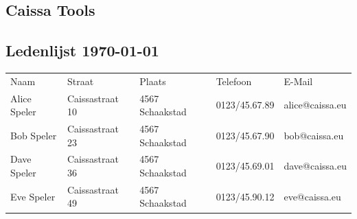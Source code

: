 \documentclass[a4paper]{scrreprt}
\begin{document}
 \begin{landscape}
  \section*{\color{headingkleur}Caissa Tools}
  \subsection*{\color{headingkleur}Ledenlijst \today{}}
  \begin{center}
   \begin{tabular}{ l l l l l }
    \rowcolor{headingkleur}
    \color{headingtekstkleur}Naam & \color{headingtekstkleur}Straat & \color{headingtekstkleur}Plaats & \color{headingtekstkleur}Telefoon & \color{headingtekstkleur}E-Mail \\
   Alice Speler & Caissastraat 10 & 4567 Schaakstad & 0123/45.67.89 & alice@caissa.eu \\
   Bob Speler & Caissastraat 23 & 4567 Schaakstad & 0123/45.67.90 & bob@caissa.eu \\
   Dave Speler & Caissastraat 36 & 4567 Schaakstad & 0123/45.69.01 & dave@caissa.eu \\
   Eve Speler & Caissastraat 49 & 4567 Schaakstad & 0123/45.90.12 & eve@caissa.eu \\
   \end{tabular}
  \end{center}
 \end{landscape}
\end{document}
